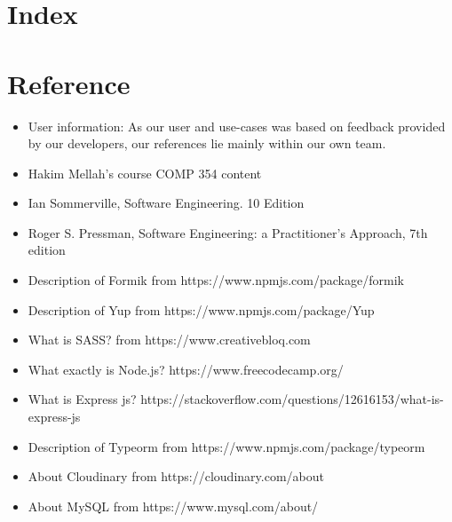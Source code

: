 \documentclass[11pt]{article}
\newcounter{use case ID}
\begin{document}
\section{Index}

\printindex


\section{Reference}

\begin{itemize}
    \item User information: As our user and use-cases was based on feedback provided by our developers, our references lie mainly within our own team.
    \item Hakim Mellah's course COMP 354 content
    \item Ian Sommerville, Software Engineering. 10 Edition
    \item Roger S. Pressman, Software Engineering: a Practitioner's Approach, 7th edition
    \item Description of Formik from https://www.npmjs.com/package/formik
    \item Description of Yup from https://www.npmjs.com/package/Yup
    \item What is SASS? from https://www.creativebloq.com
    \item What exactly is Node.js? https://www.freecodecamp.org/
    \item What is Express js? https://stackoverflow.com/questions/12616153/what-is-express-js
    \item Description of Typeorm from https://www.npmjs.com/package/typeorm
    \item About Cloudinary from https://cloudinary.com/about
    \item About MySQL from https://www.mysql.com/about/
\end{itemize}
\end{document}
